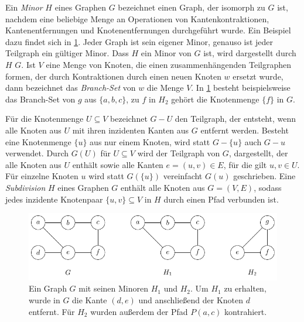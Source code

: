 Ein \emph{Minor} $H$ eines Graphen $G$ bezeichnet einen Graph, der isomorph zu $G$ ist, nachdem eine beliebige Menge an Operationen von Kantenkontraktionen, Kantenentfernungen und Knotenentfernungen durchgeführt wurde.
Ein Beispiel dazu findet sich in \Abb \ref{fig:Minor}.
Jeder Graph ist sein eigener Minor, genauso ist jeder Teilgraph ein gültiger Minor.
Dass $H$ ein Minor von $G$ ist, wird dargestellt durch $H$ \minor $G$.
Ist $V$ eine Menge von Knoten, die einen zusammenhängenden Teilgraphen formen, der durch Kontraktionen durch einen neuen Knoten $w$ ersetzt wurde, dann bezeichnet das \emph{Branch-Set} von $w$ die Menge $V$.
In \Abb \ref{fig:Minor} besteht beispielsweise das Branch-Set von $g$ aus $\{a, b, c\}$, zu $f$ in $H_2$ gehört die Knotenmenge $\{f\}$ in $G$.

Für die Knotenmenge $U \subseteq V$ bezeichnet $G - U$ den Teilgraph, der entsteht, wenn alle Knoten aus $U$ mit ihren inzidenten Kanten aus $G$ entfernt werden.
Besteht eine Knotenmenge $\{u\}$ aus nur einem Knoten, wird statt $G - \{u\}$ auch $G - u$ verwendet.
Durch $G(U)$ für $U \subseteq V$ wird der Teilgraph von $G$, dargestellt, der alle Knoten aus $U$ enthält sowie alle Kanten $e = (u, v) \in E$, für die gilt $u, v \in U$.
Für einzelne Knoten $u$ wird statt $G(\{u\})$ vereinfacht $G(u)$ geschrieben.
Eine \emph{Subdivision} $H$ eines Graphen $G$ enthält alle Knoten aus $G = (V, E)$, sodass jedes inzidente Knotenpaar $\{u, v\} \subseteq V$ in $H$ durch einen Pfad verbunden ist.
\begin{figure}[H]
  \centering
  \includegraphics[keepaspectratio]{bilder/Minor.pdf}
  \caption{Ein Graph $G$ mit seinen Minoren $H_1$ und $H_2$.
           Um $H_1$ zu erhalten, wurde in $G$ die Kante $(d, e)$ und anschließend der Knoten $d$ entfernt.
           Für $H_2$ wurden außerdem der Pfad $P(a, c)$ kontrahiert.}
  \label{fig:Minor}
\end{figure}

